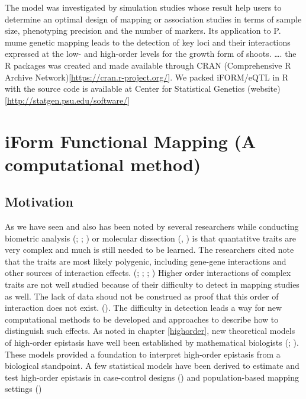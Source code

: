 \documentclass[11pt,]{book}
\theoremstyle{definition}
\theoremstyle{definition}
\theoremstyle{remark}
\begin{document}
The model was investigated by simulation studies whose result help users
to determine an optimal design of mapping or association studies in
terms of sample size, phenotyping precision and the number of markers.
Its application to P. mume genetic mapping leads to the detection of key
loci and their interactions expressed at the low- and high-order levels
for the growth form of shoots. \ldots{}. the R packages was created and
made available through CRAN (Comprehensive R Archive
Network){[}\url{https://cran.r-project.org/}{]}. We packed iFORM/eQTL in
R with the source code is available at Center for Statistical Genetics
(website){[}\url{http://statgen.psu.edu/software/}{]}

\chapter{iForm Functional Mapping (A computational
method)}\label{iform-functional-mapping-a-computational-method}

\section{Motivation}\label{motivation-2}

As we have seen and also has been noted by several researchers while
conducting biometric analysis (\cite{jinks1982biometrical};
\cite{hill2004ds}; \cite{wu1996detecting}) or molecular dissection
(\cite{mackay2009genetics}, \cite{park2010estimation}) is that
quantatitve traits are very complex and much is still needed to be
learned. The researchers cited note that the traits are most likely
polygenic, including gene-gene interactions and other sources of
interaction effects. (\cite{cheverud1995epistasis};
\cite{moore2003ubiquitous}; \cite{van2010detection};
\cite{mackay2014epistasis}) Higher order interactions of complex traits
are not well studied because of their difficulty to detect in mapping
studies as well. The lack of data shoud not be construed as proof that
this order of interaction does not exist. (\cite{taylor2015higher}). The
difficulty in detection leads a way for new computational methods to be
developed and approaches to describe how to distinguish such effects. As
noted in chapter \ref{highorder}, new theoretical models of high-order
epistasis have well been established by mathematical biologists
(\cite{hansen2001epistasis}; \cite{beerenwinkel2007analysis}). These
models provided a foundation to interpret high-order epistasis from a
biological standpoint. A few statistical models have been derived to
estimate and test high-order epistasis in case-control designs
(\cite{wang2015bayesian}) and population-based mapping settings
(\cite{pang2013statistical})
\end{document}
